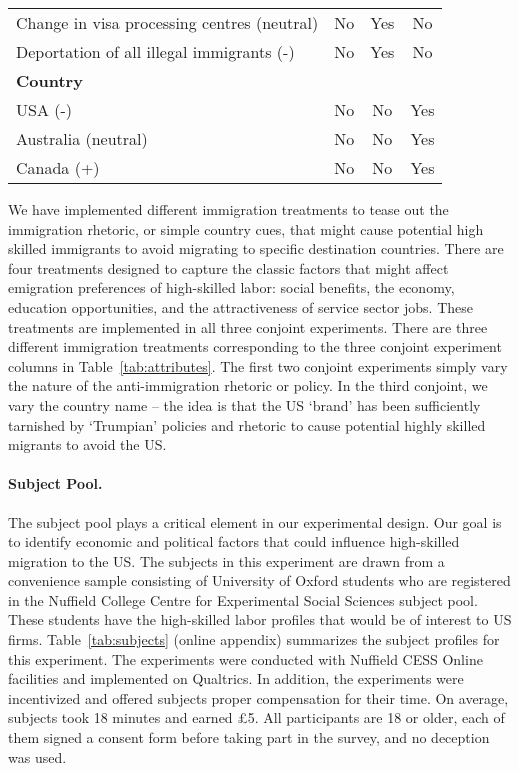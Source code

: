 \documentclass[12pt]{article}
\begin{document}
\begin{table}[!ht]
\begin{center}
\begin{tabular}{lccc}
Change in visa processing centres (neutral)& No & Yes  & No \\
  Deportation of all illegal immigrants (-)& No & Yes & No  \\
\hline\hline
\bf Country    &  & & \\
USA (-)& No & No & Yes \\
Australia (neutral)& No & No  & Yes \\
Canada (+)& No & No & Yes  \\
                  \hline\hline
\end{tabular}
\end{center}
\end{table}


\par We have implemented different immigration treatments to tease out the immigration rhetoric, or simple country cues, that might cause potential high skilled immigrants to avoid migrating to specific destination countries. There are four treatments designed to capture the classic factors that might affect emigration preferences of high-skilled labor: social benefits, the economy, education opportunities, and the attractiveness of service sector jobs. These treatments are implemented in all three conjoint experiments. There are three different immigration treatments corresponding to the three conjoint experiment columns in Table~\ref{tab:attributes}. The first two conjoint experiments simply vary the nature of the anti-immigration rhetoric or policy. In the third conjoint, we vary the country name -- the idea is that the US `brand' has been sufficiently tarnished by `Trumpian' policies and rhetoric to cause potential highly skilled migrants to avoid the US.

\paragraph{Subject Pool.} The subject pool plays a critical element in our experimental design. Our goal is to identify economic and political factors that could influence high-skilled migration to the US. The subjects in this experiment are drawn from a convenience sample consisting of University of Oxford students who are registered in the Nuffield College Centre for Experimental Social Sciences subject pool.  These students have the high-skilled labor profiles that would be of interest to US firms. Table~\ref{tab:subjects} (online appendix) summarizes the subject profiles for this experiment. The experiments were conducted with Nuffield CESS Online facilities and implemented on Qualtrics. In addition, the experiments were incentivized and offered subjects proper compensation for their time. On average, subjects took 18 minutes and earned \pounds5. All participants are 18 or older, each of them signed a consent form before taking part in the survey, and no deception was used.   
\end{document}
